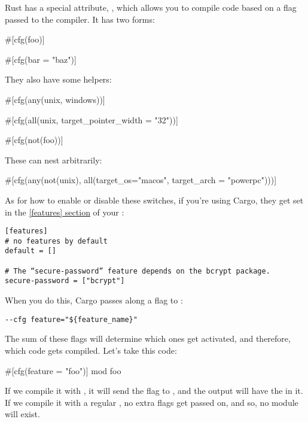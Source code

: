 Rust has a special attribute, \code{\#[cfg]}, which allows you to compile code based on a flag passed to the compiler. It has two forms:

\begin{rustc}
#[cfg(foo)]

#[cfg(bar = "baz")]
\end{rustc}

They also have some helpers:

\begin{rustc}
#[cfg(any(unix, windows))]

#[cfg(all(unix, target_pointer_width = "32"))]

#[cfg(not(foo))]
\end{rustc}

These can nest arbitrarily:

\begin{rustc}
#[cfg(any(not(unix), all(target_os="macos", target_arch = "powerpc")))]
\end{rustc}

As for how to enable or disable these switches, if you’re using Cargo, they get set in the 
\href{http://doc.crates.io/manifest.html\#the-features-section}{[features] section} of your :

\begin{verbatim}
[features]
# no features by default
default = []

# The “secure-password” feature depends on the bcrypt package.
secure-password = ["bcrypt"]
\end{verbatim}

When you do this, Cargo passes along a flag to :

\begin{verbatim}
--cfg feature="${feature_name}"
\end{verbatim}

The sum of these  flags will determine which ones get activated, and therefore, which code gets compiled. Let’s take this code:

\begin{rustc}
#[cfg(feature = "foo")]
mod foo {
}
\end{rustc}

If we compile it with , it will send the  flag to , and the 
output will have the  in it. If we compile it with a regular , no extra flags get passed on, and so, 
no  module will exist.

